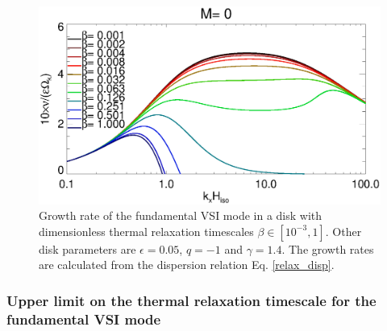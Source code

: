 \begin{figure}
  \includegraphics[width=\linewidth,clip=true,trim=0cm 0.0cm 0cm 0cm]{figures/rate_theory_grow_relax}
  \caption{Growth rate of the fundamental VSI mode in a disk with
    dimensionless thermal relaxation timescales
    $\beta\in[10^{-3},1]$.  Other disk parameters are
    $\epsilon=0.05$, $q=-1$ and $\gamma=1.4$. The growth rates are
    calculated from the dispersion relation Eq. \ref{relax_disp}. 
    \label{relax_disp_fig}}  
\end{figure}   


\subsubsection{Upper limit on the thermal relaxation timescale for the
  fundamental VSI mode}\label{iso_vsi_beta_crit}


